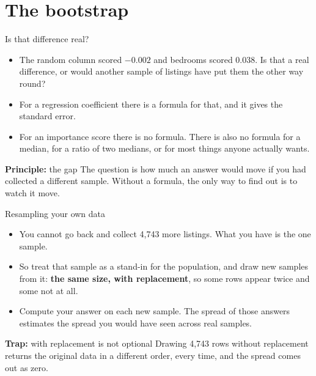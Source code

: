 \documentclass[aspectratio=169]{beamer}
\newenvironment{principle}[1]{\begin{block}{\textbf{Principle:} #1}}{\end{block}}
\newenvironment{trap}[1]{\begin{alertblock}{\textbf{Trap:} #1}}{\end{alertblock}}
\begin{document}
\section{The bootstrap}
\begin{frame}{Is that difference real?}
\begin{itemize}
  \item The random column scored $-0.002$ and bedrooms scored $0.038$. Is that a real difference,
        or would another sample of listings have put them the other way round?
  \item For a regression coefficient there is a formula for that, and it gives the standard error.
  \item For an importance score there is no formula. There is also no formula for a median, for a
        ratio of two medians, or for most things anyone actually wants.
\end{itemize}
\begin{principle}{the gap}
The question is how much an answer would move if you had collected a different sample. Without a
formula, the only way to find out is to watch it move.
\end{principle}
\end{frame}

\begin{frame}{Resampling your own data}
\begin{itemize}
  \item You cannot go back and collect 4,743 more listings. What you have is the one sample.
  \item So treat that sample as a stand-in for the population, and draw new samples from it:
        \textbf{the same size, with replacement}, so some rows appear twice and some not at all.
  \item Compute your answer on each new sample. The spread of those answers estimates the spread
        you would have seen across real samples.
\end{itemize}
\begin{trap}{with replacement is not optional}
Drawing 4,743 rows without replacement returns the original data in a different order, every
time, and the spread comes out as zero.
\end{trap}
\end{frame}
\end{document}

